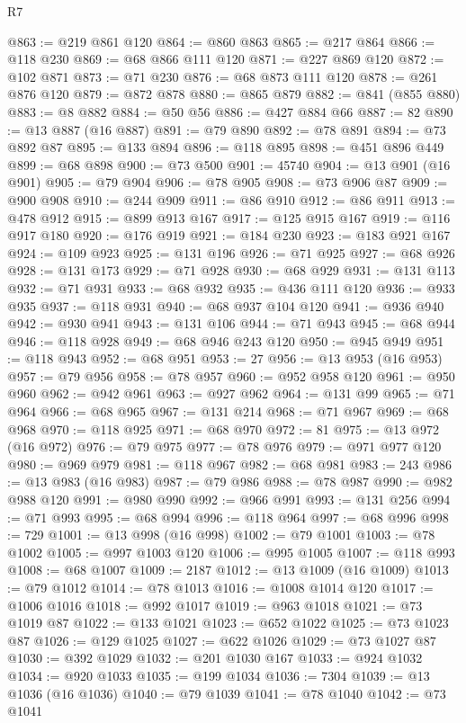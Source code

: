 \begin{lexlean}{R7}
\begin{coremodule}
@863 := @219 @861 @120
@864 := @860 @863
@865 := @217 @864
@866 := @118 @230
@869 := @68 @866 @111 @120
@871 := @227 @869 @120
@872 := @102 @871
@873 := @71 @230
@876 := @68 @873 @111 @120
@878 := @261 @876 @120
@879 := @872 @878
@880 := @865 @879
@882 := @841 (@855 @880)
@883 := @8 @882
@884 := @50 @56
@886 := @427 @884 @66
@887 := 82
@890 := @13 @887 (@16 @887)
@891 := @79 @890
@892 := @78 @891
@894 := @73 @892 @87
@895 := @133 @894
@896 := @118 @895
@898 := @451 @896 @449
@899 := @68 @898
@900 := @73 @500
@901 := 45740
@904 := @13 @901 (@16 @901)
@905 := @79 @904
@906 := @78 @905
@908 := @73 @906 @87
@909 := @900 @908
@910 := @244 @909
@911 := @86 @910
@912 := @86 @911
@913 := @478 @912
@915 := @899 @913 @167
@917 := @125 @915 @167
@919 := @116 @917 @180
@920 := @176 @919
@921 := @184 @230
@923 := @183 @921 @167
@924 := @109 @923
@925 := @131 @196
@926 := @71 @925
@927 := @68 @926
@928 := @131 @173
@929 := @71 @928
@930 := @68 @929
@931 := @131 @113
@932 := @71 @931
@933 := @68 @932
@935 := @436 @111 @120
@936 := @933 @935
@937 := @118 @931
@940 := @68 @937 @104 @120
@941 := @936 @940
@942 := @930 @941
@943 := @131 @106
@944 := @71 @943
@945 := @68 @944
@946 := @118 @928
@949 := @68 @946 @243 @120
@950 := @945 @949
@951 := @118 @943
@952 := @68 @951
@953 := 27
@956 := @13 @953 (@16 @953)
@957 := @79 @956
@958 := @78 @957
@960 := @952 @958 @120
@961 := @950 @960
@962 := @942 @961
@963 := @927 @962
@964 := @131 @99
@965 := @71 @964
@966 := @68 @965
@967 := @131 @214
@968 := @71 @967
@969 := @68 @968
@970 := @118 @925
@971 := @68 @970
@972 := 81
@975 := @13 @972 (@16 @972)
@976 := @79 @975
@977 := @78 @976
@979 := @971 @977 @120
@980 := @969 @979
@981 := @118 @967
@982 := @68 @981
@983 := 243
@986 := @13 @983 (@16 @983)
@987 := @79 @986
@988 := @78 @987
@990 := @982 @988 @120
@991 := @980 @990
@992 := @966 @991
@993 := @131 @256
@994 := @71 @993
@995 := @68 @994
@996 := @118 @964
@997 := @68 @996
@998 := 729
@1001 := @13 @998 (@16 @998)
@1002 := @79 @1001
@1003 := @78 @1002
@1005 := @997 @1003 @120
@1006 := @995 @1005
@1007 := @118 @993
@1008 := @68 @1007
@1009 := 2187
@1012 := @13 @1009 (@16 @1009)
@1013 := @79 @1012
@1014 := @78 @1013
@1016 := @1008 @1014 @120
@1017 := @1006 @1016
@1018 := @992 @1017
@1019 := @963 @1018
@1021 := @73 @1019 @87
@1022 := @133 @1021
@1023 := @652 @1022
@1025 := @73 @1023 @87
@1026 := @129 @1025
@1027 := @622 @1026
@1029 := @73 @1027 @87
@1030 := @392 @1029
@1032 := @201 @1030 @167
@1033 := @924 @1032
@1034 := @920 @1033
@1035 := @199 @1034
@1036 := 7304
@1039 := @13 @1036 (@16 @1036)
@1040 := @79 @1039
@1041 := @78 @1040
@1042 := @73 @1041

\end{coremodule}
\end{lexlean}

